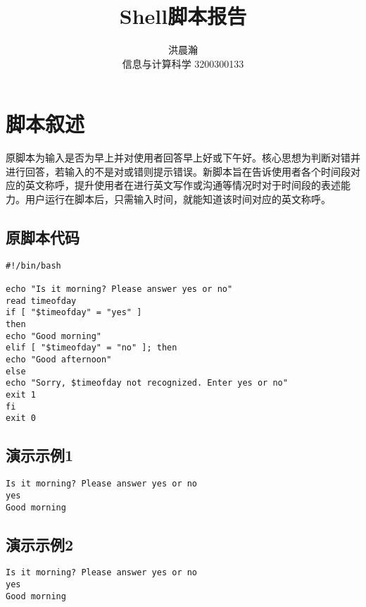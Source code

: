 \documentclass{ctexart}
\title{Shell脚本报告}
\author{洪晨瀚 \\ 信息与计算科学 3200300133}
\begin{document}
\maketitle

\section{脚本叙述}
原脚本为输入是否为早上并对使用者回答早上好或下午好。核心思想为判断对错并进行回答，若输入的不是对或错则提示错误。新脚本旨在告诉使用者各个时间段对应的英文称呼，提升使用者在进行英文写作或沟通等情况时对于时间段的表述能力。用户运行在脚本后，只需输入时间，就能知道该时间对应的英文称呼。

\subsection{原脚本代码}
\begin{verbatim}
#!/bin/bash

echo "Is it morning? Please answer yes or no"
read timeofday
if [ "$timeofday" = "yes" ]
then
echo "Good morning"
elif [ "$timeofday" = "no" ]; then
echo "Good afternoon"
else
echo "Sorry, $timeofday not recognized. Enter yes or no"
exit 1
fi
exit 0
\end{verbatim}

\subsection{演示示例1}
\begin{verbatim}
Is it morning? Please answer yes or no
yes
Good morning
\end{verbatim}

\subsection{演示示例2}
\begin{verbatim}
Is it morning? Please answer yes or no
yes
Good morning
\end{verbatim}
\end{document}
